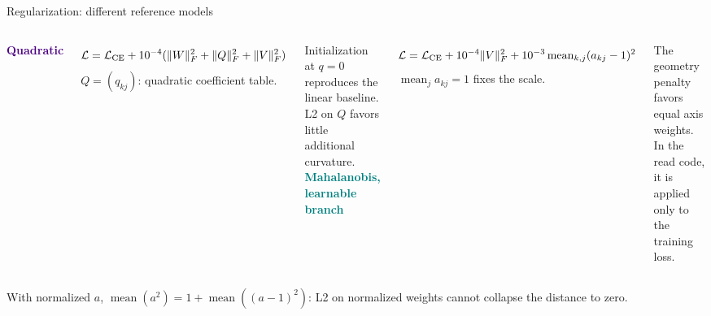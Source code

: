 \documentclass[aspectratio=169,10pt]{beamer}
\begin{document}
\begin{frame}{Regularization: different reference models}

\begin{columns}[T,onlytextwidth]
\textcolor{Indigo}{\textbf{Quadratic}}\par
\[\mathcal L=\mathcal L_{\rm CE}+10^{-4}(\|W\|_F^2+\|Q\|_F^2+\|V\|_F^2)\]
\small $Q=(q_{kj})$: quadratic coefficient table.\par
\vspace{2mm}
Initialization at $q=0$ reproduces the linear baseline. L2 on $Q$ favors little additional curvature.
\textcolor{Teal}{\textbf{Mahalanobis, learnable branch}}\par
\[\mathcal L=\mathcal L_{\rm CE}+10^{-4}\|V\|_F^2
+10^{-3}\operatorname{mean}_{k,j}(a_{kj}-1)^2\]
\small $\operatorname{mean}_j a_{kj}=1$ fixes the scale.\par
\vspace{2mm}
The geometry penalty favors equal axis weights. In the read code, it is applied only to the training loss.
\end{columns}
\vspace{3mm}
\small With normalized $a$, $\operatorname{mean}(a^2)=1+\operatorname{mean}((a-1)^2)$: L2 on normalized weights cannot collapse the distance to zero.

\end{frame}
\end{document}
